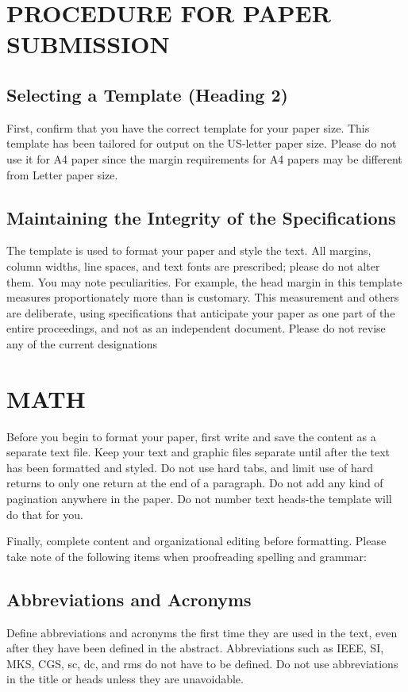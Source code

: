 \documentclass[a4paper, 10pt, conference]{ieeeconf}      %
\begin{document}
	\section{PROCEDURE FOR PAPER SUBMISSION}
	
	\subsection{Selecting a Template (Heading 2)}
	
	First, confirm that you have the correct template for your paper size. This template has been tailored for output on the US-letter paper size. Please do not use it for A4 paper since the margin requirements for A4 papers may be different from Letter paper size.
	
	\subsection{Maintaining the Integrity of the Specifications}
	
	The template is used to format your paper and style the text. All margins, column widths, line spaces, and text fonts are prescribed; please do not alter them. You may note peculiarities. For example, the head margin in this template measures proportionately more than is customary. This measurement and others are deliberate, using specifications that anticipate your paper as one part of the entire proceedings, and not as an independent document. Please do not revise any of the current designations
	
	\section{MATH}
	
	Before you begin to format your paper, first write and save the content as a separate text file. Keep your text and graphic files separate until after the text has been formatted and styled. Do not use hard tabs, and limit use of hard returns to only one return at the end of a paragraph. Do not add any kind of pagination anywhere in the paper. Do not number text heads-the template will do that for you.
	
	Finally, complete content and organizational editing before formatting. Please take note of the following items when proofreading spelling and grammar:
	
	\subsection{Abbreviations and Acronyms} Define abbreviations and acronyms the first time they are used in the text, even after they have been defined in the abstract. Abbreviations such as IEEE, SI, MKS, CGS, sc, dc, and rms do not have to be defined. Do not use abbreviations in the title or heads unless they are unavoidable.
	
\end{document}
